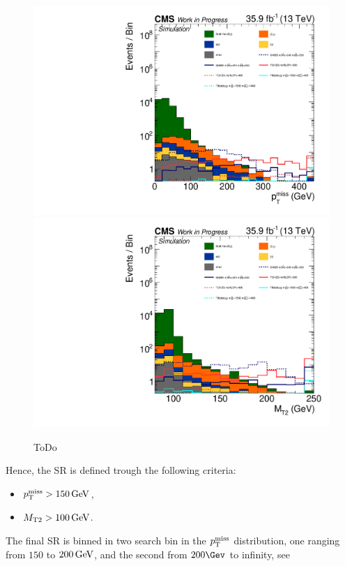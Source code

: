 \begin{figure}[tbp]
 \centering
 \includegraphics[width=\pairwidth]{figures/mt2/onZ_LL_met_log}
 \includegraphics[width=\pairwidth]{figures/mt2/onZ_LL_mt2_log}
 \caption{ToDo}
 \label{fig:SRvariables}
\end{figure}
Hence, the SR is defined trough the following criteria:
\begin{itemize}
 \item $p_{\mathrm{T}}^\text{miss}>150\,\text{Ge\hspace{-.08em}V}$,
 \item $M_{\mathrm{T2}}>100\,\text{Ge\hspace{-.08em}V}$.
       
\end{itemize}
The final SR is binned in two search bin in the $p_{\mathrm{T}}^\text{miss}$ distribution, one ranging from $150$ to $200\,\text{Ge\hspace{-.08em}V}$, and the second from $200\Gev$ to infinity, see 


